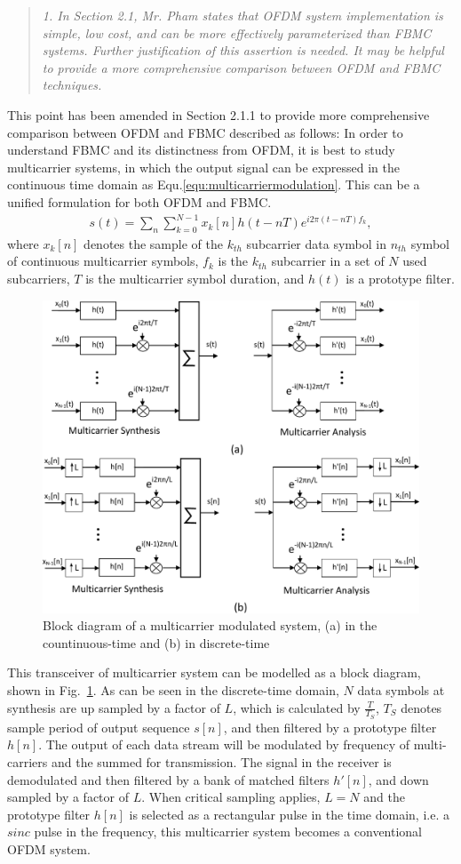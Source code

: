 \documentclass{article}
\begin{document}
\begin{quote}
\emph{1. In Section 2.1, Mr. Pham states that OFDM system implementation is simple, low cost, and can be more effectively parameterized than FBMC systems. Further justification of this assertion is needed. It may be helpful to provide a more comprehensive comparison between OFDM and FBMC techniques.}
\end{quote}
This point has been amended in Section 2.1.1 to provide more comprehensive comparison between OFDM and FBMC described as follows:
In order to understand FBMC and its distinctness from OFDM, it is best to study multicarrier systems, in which the output signal can be expressed in the continuous time domain as Equ.\ref{equ:multicarriermodulation}.
This can be a unified formulation for both OFDM and FBMC.
\begin{eqnarray}
\label{equ:multicarriermodulation}
s(t) = \sum_{n}\sum_{k  = 0}^{N-1} x_{k}[n] h(t-nT)e^{i2\pi (t-nT)f_{k}},
\end{eqnarray}
where $x_{k}[n]$ denotes the sample of the $k_{th}$ subcarrier data symbol in $n_{th}$ symbol of continuous multicarrier symbols, $f_{k}$ is the $k_{th}$ subcarrier in a set of $N$ used subcarriers, $T$ is the multicarrier symbol duration, and $h(t)$ is a prototype filter.
\begin{figure}[b]
	\centerline{\includegraphics [width=0.8\columnwidth] {../Figures/multucarrier_system} }
	\caption{Block diagram of a multicarrier modulated system, (a) in the countinuous-time and (b) in discrete-time}
	\label{fig:multicarrier-block}
\end{figure}
This transceiver of multicarrier system can be modelled as a block diagram, shown in Fig.~\ref{fig:multicarrier-block}.
As can be seen in the discrete-time domain, $N$ data symbols at synthesis are up sampled by a factor of $L$, which is calculated by $\frac{T}{T_{S}}$, $T_{S}$ denotes sample period of output sequence $s[n]$, and then filtered by a prototype filter $h[n]$. The output of each data stream will be modulated by frequency of multi-carriers and the summed for transmission.
The signal in the receiver is demodulated and then filtered by a bank of matched filters $h'[n]$, and down sampled by a factor of $L$.
When critical sampling applies, $L = N$ and the prototype filter $h[n]$ is selected as a rectangular pulse in the time domain, i.e. a $sinc$ pulse in the frequency, this multicarrier system becomes a conventional OFDM system.
\end{document}
